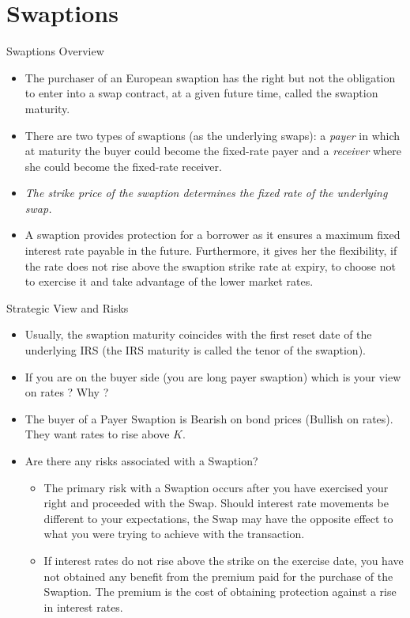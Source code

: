 \documentclass{beamer}
\begin{document}
\section{Swaptions}
\begin{frame}{Swaptions Overview}
	\begin{itemize}
		\item<1-> The purchaser of an \textcolor{maincolor}{European swaption} has the right but not the obligation to enter into a swap contract, at a given future time, called the \textcolor{maincolor}{swaption maturity}.
		\item<2-> There are two types of \textcolor{maincolor}{swaptions} (as the underlying swaps): a \emph{payer} in which at maturity the buyer could become the fixed-rate payer and a \emph{receiver} where she could become the fixed-rate receiver.
		\item <3-> \emph{The strike price of the swaption determines the fixed rate of the underlying swap.}
		\item<4-> A swaption provides protection for a borrower as it ensures a maximum fixed interest rate payable in the future. Furthermore, it gives her the flexibility, if the rate does not rise above the swaption strike rate at expiry, to choose not to exercise it and take advantage of the lower market rates.
	\end{itemize}
\end{frame}

\begin{frame}{Strategic View and Risks}
	\begin{itemize}
		\item<1-> Usually, the swaption maturity coincides with the first reset date of the underlying IRS (the IRS maturity is called the \textcolor{maincolor}{tenor} of the swaption).
		\item<1-> If you are on the buyer side (you are long payer swaption) which is your view on rates ? Why ?
		\item<2-> The buyer of a Payer Swaption is Bearish on bond prices (Bullish on rates). They want rates to rise above $K$.
		\item<3-> Are there any risks associated with a Swaption?
		\begin{itemize}
			\item<4-> The primary risk with a Swaption occurs after you have exercised your right and proceeded with the Swap. Should interest rate movements be different to your expectations, the Swap may have the opposite effect to what you were trying to achieve with the transaction.
			\item<5-> If interest rates do not rise above the strike on the exercise date, you have not obtained any benefit from the premium paid for the purchase of the Swaption. The premium is the cost of obtaining protection against a rise in interest rates.
		\end{itemize}
	\end{itemize}
\end{frame}
\end{document}

